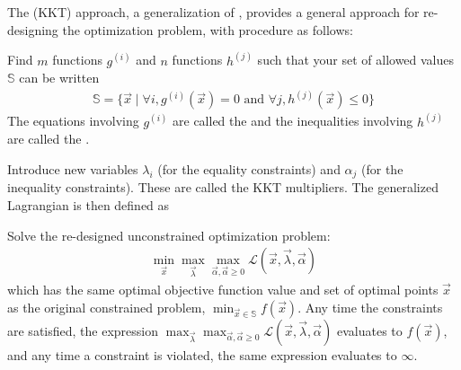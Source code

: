 \documentclass[11pt]{article}
\begin{document}
The  (KKT) approach, a generalization of , provides a general approach for re-designing the optimization problem, with procedure as follows:
\begin{compactenum}
	\item Find $m$ functions $g^{(i)}$ and $n$ functions $h^{(j)}$ such that your set of allowed values $\mathbb{S}$ can be written
	\begin{align}
		\mathbb{S} = \{ \vec x \mid \forall i, g^{(i)}(\vec x) = 0 \text{ and } \forall j, h^{(j)}(\vec x) \le 0   \}
	\end{align}
	The equations involving $g^{(i)}$ are called the  and the inequalities involving $h^{(j)}$ are called the . 
	
	\item Introduce new variables $\lambda_i$ (for the equality constraints) and $\alpha_j$ (for the inequality constraints). These are called the KKT multipliers. The generalized Lagrangian is then defined as
	
	\item Solve the re-designed unconstrained optimization problem:
	\begin{align}
		\min_{\vec x} \max_{\vec{\lambda}} \max_{\vec{\alpha}, \vec{\alpha} \ge 0}
		\mathcal{L}(\vec x, \vec{\lambda}, \vec{\alpha}) \label{KKT-opt}
	\end{align}
	which has the same optimal objective function value and set of optimal points $\vec x$ as the original constrained problem, $\min_{\vec x \in \mathbb{S}} f(\vec x)$. Any time the constraints are satisfied, the expression $\max_{\vec{\lambda}} \max_{\vec{\alpha}, \vec{\alpha} \ge 0}
	\mathcal{L}(\vec x, \vec{\lambda}, \vec{\alpha})$ evaluates to $f(\vec x)$, and any time a constraint is violated, the same expression evaluates to $\infty$. 
	
\end{compactenum}

\end{document}
